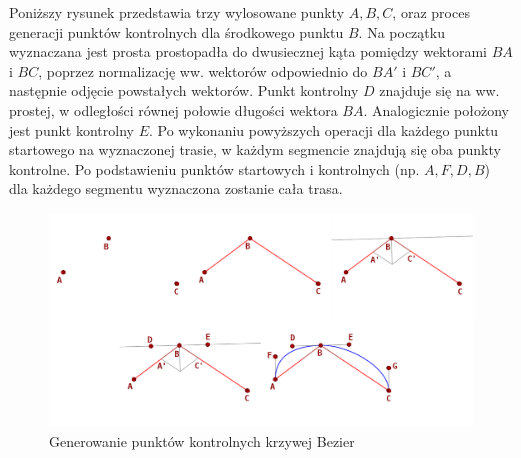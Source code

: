 Poniższy rysunek przedstawia trzy wylosowane punkty $A,B,C$, oraz proces generacji punktów kontrolnych dla środkowego punktu $B$. Na początku wyznaczana jest prosta prostopadła do dwusiecznej kąta pomiędzy wektorami $BA$ i $BC$, poprzez normalizację ww. wektorów odpowiednio do $BA'$ i $BC'$, a następnie odjęcie powstałych wektorów. Punkt kontrolny $D$ znajduje się na ww. prostej, w odległości równej połowie długości wektora $BA$. Analogicznie położony jest punkt kontrolny $E$. Po wykonaniu powyższych operacji dla każdego punktu startowego na wyznaczonej trasie, w każdym segmencie znajdują się oba punkty kontrolne. Po podstawieniu punktów startowych i kontrolnych (np. $A,F,D,B$) dla każdego segmentu wyznaczona zostanie cała trasa.

\begin{figure}[h]
    \includegraphics[width=\textwidth]{figures/loop_creation}
    \caption{Generowanie punktów kontrolnych krzywej Bezier}
    \label{fig}
\end{figure}

